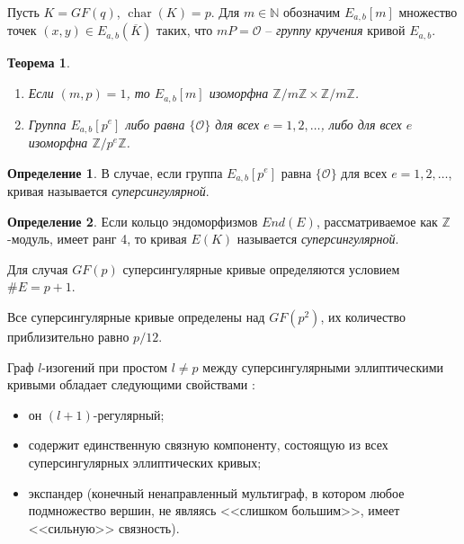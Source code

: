 \documentclass[a4paper,12pt]{article}
\newcommand{\ZZ}{\mathbb{Z}}
\newcommand{\NN}{\mathbb{N}}
\DeclareMathOperator{\Char}{char}
\newtheorem{theorem}{Теорема}
\theoremstyle{definition}
\newtheorem{definition}{Определение}
\newtheorem{example}{Пример}
\begin{document}
Пусть $K=GF(q)$, $\Char (K)=p$. Для $m\in\NN$ обозначим $E_{a,b}[m]$ множество точек $(x,y)\in E_{a,b}(\overline{K})$ таких, что $mP=\mathcal{O}$ -- \emph{группу кручения} кривой $E_{a,b}$. 

\begin{theorem}\label{thx}
 \begin{enumerate}
  \item Если $(m,p)=1$, то  $E_{a,b}[m]$ изоморфна $\ZZ/m\ZZ\times \ZZ/m\ZZ$.
  \item Группа $E_{a,b}[p^e] $ либо равна $\{\mathcal{O}\}$ для всех $e=1,2,\dots$, %
  либо для всех $e$  изоморфна $\ZZ/p^e\ZZ$.  
 \end{enumerate}
\end{theorem}

\begin{definition}
В случае, если группа $E_{a,b}[p^e] $  равна $\{\mathcal{O}\}$ для всех $e=1,2,\dots$, кривая называется \emph{суперсингулярной}.
\end{definition}

\begin{definition}
Если кольцо эндоморфизмов $End(E)$, рассматриваемое как $\ZZ$-модуль, имеет ранг 4, то кривая  $E(K)$ называется \emph{суперсингулярной}. 
\end{definition}


Для случая $GF(p)$ суперсингулярные кривые определяются условием $\#E=p+1$. %



Все суперсингулярные кривые определены над $GF(p^2)$, их количество приблизительно равно $p/12$.

Граф $l$-изогений при простом $l\neq p$ между суперсингулярными эллиптическими кривыми обладает следующими свойствами \cite{Piz1, Piz2}:
\begin{itemize}
 \item он $(l+1)$-регулярный;
 \item содержит единственную связную компоненту, состоящую из всех суперсингулярных эллиптических кривых;%
\item экспандер (конечный ненаправленный мультиграф, в котором любое подмножество вершин, не являясь <<слишком большим>>, имеет <<сильную>> связность).
 \end{itemize}
\end{document}
